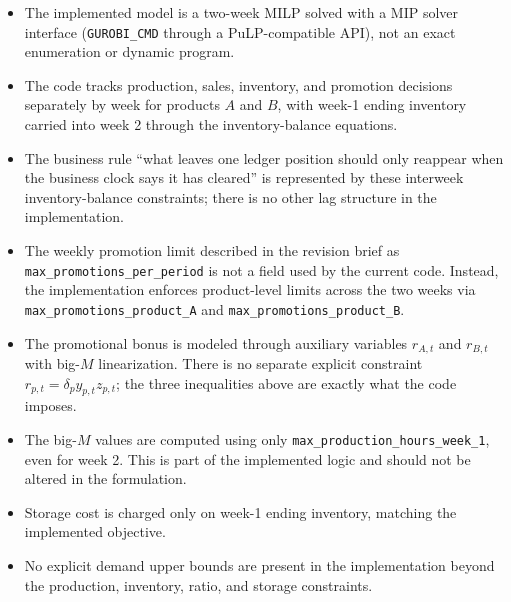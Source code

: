 \begin{itemize}
    \item The implemented model is a two-week MILP solved with a MIP solver interface (\texttt{GUROBI\_CMD} through a PuLP-compatible API), not an exact enumeration or dynamic program.
    \item The code tracks production, sales, inventory, and promotion decisions separately by week for products $A$ and $B$, with week-1 ending inventory carried into week 2 through the inventory-balance equations.
    \item The business rule ``what leaves one ledger position should only reappear when the business clock says it has cleared'' is represented by these interweek inventory-balance constraints; there is no other lag structure in the implementation.
    \item The weekly promotion limit described in the revision brief as \texttt{max\_promotions\_per\_period} is not a field used by the current code. Instead, the implementation enforces product-level limits across the two weeks via \texttt{max\_promotions\_product\_A} and \texttt{max\_promotions\_product\_B}.
    \item The promotional bonus is modeled through auxiliary variables $r_{A,t}$ and $r_{B,t}$ with big-$M$ linearization. There is no separate explicit constraint $r_{p,t} = \delta_p y_{p,t} z_{p,t}$; the three inequalities above are exactly what the code imposes.
    \item The big-$M$ values are computed using only \texttt{max\_production\_hours\_week\_1}, even for week 2. This is part of the implemented logic and should not be altered in the formulation.
    \item Storage cost is charged only on week-1 ending inventory, matching the implemented objective.
    \item No explicit demand upper bounds are present in the implementation beyond the production, inventory, ratio, and storage constraints.
\end{itemize}

